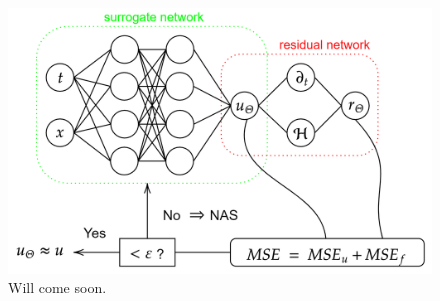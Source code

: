 \begin{figure}[H]
    \begin{center}
        \includegraphics[scale=0.3]{img/diagram-20220212.png}
    \end{center}
    \caption{Will come soon.}
    \label{fig6}
\end{figure}


